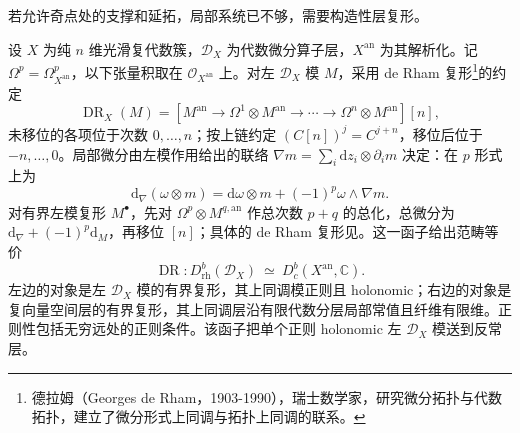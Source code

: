 \ProseParagraphBreak
若允许奇点处的支撑和延拓，局部系统已不够，需要构造性层复形。
\begin{theorem}\label{b5:thm:D-rh-derived}
	设 \(X\) 为纯 \(n\) 维光滑复代数簇，\(\mathcal D_X\) 为代数微分算子层，\(X^{\mathrm{an}}\) 为其解析化。记 \(\Omega^p=\Omega^p_{X^{\mathrm{an}}}\)，以下张量积取在 \(\mathcal O_{X^{\mathrm{an}}}\) 上。对左 \(\mathcal D_X\) 模 \(M\)，采用 de Rham 复形\footnote{德拉姆（Georges de Rham，1903-1990），瑞士数学家，研究微分拓扑与代数拓扑，建立了微分形式上同调与拓扑上同调的联系。}的约定
	\[
		\operatorname{DR}_X(M) =\left[ M^{\mathrm{an}}\longrightarrow \Omega^1\otimes M^{\mathrm{an}} \longrightarrow\cdots\longrightarrow \Omega^n\otimes M^{\mathrm{an}} \right][n],
	\]
	未移位的各项位于次数 \(0,\ldots,n\)；按上链约定 \((C[n])^j=C^{j+n}\)，移位后位于 \(-n,\ldots,0\)。局部微分由左模作用给出的联络 \(\nabla m=\sum_i\mathrm{d}z_i\otimes\partial_i m\) 决定：在 \(p\) 形式上为
	\[
		\mathrm{d}_{\nabla}(\omega\otimes m) =\mathrm{d}\omega\otimes m+(-1)^p\omega\wedge\nabla m.
	\]
	对有界左模复形 \(M^\bullet\)，先对 \(\Omega^p\otimes M^{q,\mathrm{an}}\) 作总次数 \(p+q\) 的总化，总微分为 \(\mathrm{d}_{\nabla}+(-1)^p\mathrm{d}_{M}\)，再移位 \([n]\)；具体的 de Rham 复形见\cite[Section 4.2, pp. 103--105]{HottaTakeuchiTanisaki2008DModules}。这一函子给出范畴等价
	\[
		\operatorname{DR}:D^b_{\mathrm{rh}}(\mathcal D_X) \ \simeq\ D^b_c(X^{\mathrm{an}},\mathbb C).
	\]
	左边的对象是左 \(\mathcal D_X\) 模的有界复形，其上同调模正则且 holonomic；右边的对象是复向量空间层的有界复形，其上同调层沿有限代数分层局部常值且纤维有限维。正则性包括无穷远处的正则条件。该函子把单个正则 holonomic 左 \(\mathcal D_X\) 模送到反常层。
\end{theorem}
